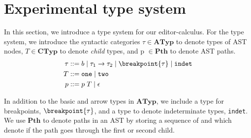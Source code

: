 


\section{Experimental type system}

In this section, we introduce a type system for our editor-calculus. For the type system, we introduce the syntactic categories $\tau \in \mathbf{ATyp}$ to denote types of AST nodes, $T \in \mathbf{CTyp}$ to denote \textit{child} types, and p $\in \mathbf{Pth}$ to denote AST paths.
%
\begin{align*}
    \tau ::=&\; b \mid \tau_1 \rightarrow \tau_2 \mid \breakpoint{\tau} \mid \texttt{indet}\\
    T ::=&\; \texttt{one} \mid \texttt{two}\\
    p ::=&\; p\; T \mid \epsilon
\end{align*}

In addition to the basic and arrow types in $\mathbf{ATyp}$, we include a type for breakpoints, $\breakpoint{\tau}$, and a type to denote indeterminate types, \texttt{indet}. We use $\mathbf{Pth}$ to denote paths in an AST by storing a sequence of  and  which denote if the path goes through the first or second child.\\

